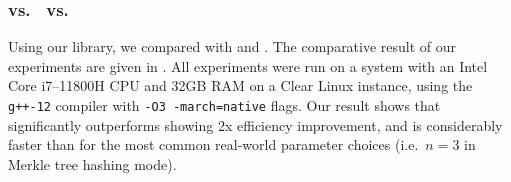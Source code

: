 \subsubsection*{\Arion{} vs.\  \Griffin{} vs.\  \Poseidon{}}
\begin{table}
  \centering
  \caption{Performance of various hash functions for generating a proof of membership in a Merkle 
      tree accumulator over BN254. Proving times are in milliseconds.}\label{tab:runtimes}
\end{table}

Using our library, we compared \Arion{} with \Griffin{} and \Poseidon{}.
The comparative result of our experiments are given in . 
All experiments were run on a system with an Intel Core i7--11800H CPU and 32GB RAM on a Clear Linux 
instance, using the \texttt{g++-12} compiler with \texttt{-O3 -march=native} flags.
Our result shows that \Arionhash{} significantly outperforms \Poseidon{} showing \(2\)x efficiency 
improvement, and \Aarionhash{} is considerably faster than \Griffin{} for the most common
real-world parameter choices (i.e.\  \(n = 3\) in Merkle tree hashing mode).
